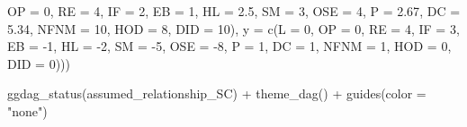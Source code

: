 \documentclass[
]{article}
\newenvironment{Shaded}{\begin{snugshade}}{\end{snugshade}}
\newcommand{\AttributeTok}[1]{\textcolor[rgb]{0.77,0.63,0.00}{#1}}
\newcommand{\DecValTok}[1]{\textcolor[rgb]{0.00,0.00,0.81}{#1}}
\newcommand{\FloatTok}[1]{\textcolor[rgb]{0.00,0.00,0.81}{#1}}
\newcommand{\FunctionTok}[1]{\textcolor[rgb]{0.00,0.00,0.00}{#1}}
\newcommand{\NormalTok}[1]{#1}
\newcommand{\SpecialCharTok}[1]{\textcolor[rgb]{0.00,0.00,0.00}{#1}}
\newcommand{\StringTok}[1]{\textcolor[rgb]{0.31,0.60,0.02}{#1}}
\begin{document}
\begin{Shaded}
\begin{Highlighting}[]
                                                              \AttributeTok{OP =} \DecValTok{0}\NormalTok{,}
                                                              \AttributeTok{RE =} \DecValTok{4}\NormalTok{, }\AttributeTok{IF =} \DecValTok{2}\NormalTok{,}
                                                              \AttributeTok{EB =} \DecValTok{1}\NormalTok{, }\AttributeTok{HL =} \FloatTok{2.5}\NormalTok{,  }\AttributeTok{SM =} \DecValTok{3}\NormalTok{, }\AttributeTok{OSE =} \DecValTok{4}\NormalTok{,}
                                                              \AttributeTok{P =} \FloatTok{2.67}\NormalTok{,}
                                                              \AttributeTok{DC =} \FloatTok{5.34}\NormalTok{,}
                                                              \AttributeTok{NFNM =} \DecValTok{10}\NormalTok{,}
                                                              \AttributeTok{HOD =} \DecValTok{8}\NormalTok{,}
                                                              \AttributeTok{DID =} \DecValTok{10}\NormalTok{), }
                                                        \AttributeTok{y =}  \FunctionTok{c}\NormalTok{(}\AttributeTok{L =} \DecValTok{0}\NormalTok{,}
                                                              \AttributeTok{OP =} \DecValTok{0}\NormalTok{,}
                                                              \AttributeTok{RE =} \DecValTok{4}\NormalTok{, }\AttributeTok{IF =} \DecValTok{3}\NormalTok{,}
                                                              \AttributeTok{EB =} \SpecialCharTok{{-}}\DecValTok{1}\NormalTok{, }\AttributeTok{HL =} \SpecialCharTok{{-}}\DecValTok{2}\NormalTok{,  }\AttributeTok{SM =} \SpecialCharTok{{-}}\DecValTok{5}\NormalTok{, }\AttributeTok{OSE =} \SpecialCharTok{{-}}\DecValTok{8}\NormalTok{,}
                                                              \AttributeTok{P =} \DecValTok{1}\NormalTok{,}
                                                              \AttributeTok{DC =} \DecValTok{1}\NormalTok{,}
                                                              \AttributeTok{NFNM =} \DecValTok{1}\NormalTok{,}
                                                              \AttributeTok{HOD =} \DecValTok{0}\NormalTok{,}
                                                              \AttributeTok{DID =} \DecValTok{0}\NormalTok{)))}

\FunctionTok{ggdag\_status}\NormalTok{(assumed\_relationship\_SC) }\SpecialCharTok{+}
  \FunctionTok{theme\_dag}\NormalTok{() }\SpecialCharTok{+}
  \FunctionTok{guides}\NormalTok{(}\AttributeTok{color =} \StringTok{"none"}\NormalTok{)}
\end{Highlighting}
\end{Shaded}
\end{document}
